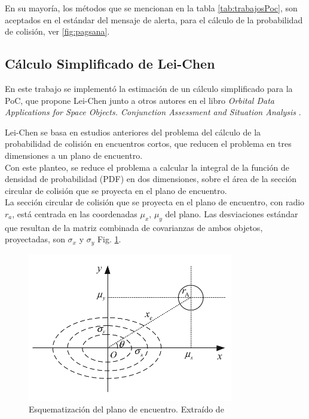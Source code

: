 {En su mayor\'ia, los m\'etodos que se mencionan en la tabla \ref{tab:trabajosPoc}, son aceptados en el est\'andar del mensaje de alerta, para el c\'alculo de la probabilidad de colisi\'on, ver \ref{fig:pagsana}.

% 
  

\subsection{C\'alculo Simplificado de Lei-Chen}\label{subsec:pocsimp}

En este trabajo se implement\'o la estimaci\'on de un c\'alculo simplificado para la PoC, que propone Lei-Chen junto a otros autores en el libro 
{\it{Orbital Data Applications for Space Objects. Conjunction Assessment and Situation Analysis}} \citep{leichen}.

Lei-Chen se basa en estudios anteriores del problema del c\'alculo de la probabilidad de colisi\'on en encuentros cortos, que reducen el problema en tres dimensiones a un plano de encuentro.\\
Con este planteo, se reduce el problema a calcular la integral de la funci\'on de densidad de probabilidad (PDF) en dos dimensiones, sobre el \'area de la secci\'on circular de colisi\'on que se proyecta en el plano de encuentro.\\

La secci\'on circular de colisi\'on que se proyecta en el plano de encuentro, con radio $r_{a}$, est\'a centrada en las coordenadas $\mu_{x}$, $\mu_{y}$ del plano. Las desviaciones est\'andar que resultan de la matriz combinada de covarianzas de ambos objetos, proyectadas, son $\sigma_{x}$ y $\sigma_{y}$ Fig. \ref{fig:planoenc}.\\

\begin{figure}[!h]
\centering
\includegraphics[width=0.8\textwidth]{imagenes/planodeencuentro}
\caption[Plano de Encuentro]{Esquematizaci\'on del plano de encuentro. Extra\'ido de \cite{leichen}}
\label{fig:planoenc}
\end{figure}

}
